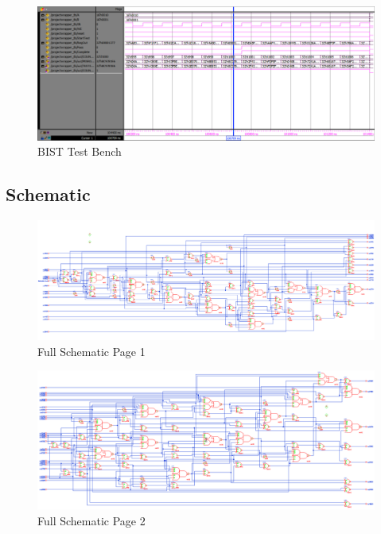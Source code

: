 \documentclass[11pt]{article}
\begin{document}
		\begin{figure}[H] 
			\centering 
			\includegraphics[width=\textwidth,height=\dimexpr\textheight-4\baselineskip-\abovecaptionskip-\belowcaptionskip\relax,keepaspectratio]{"Pictures/BIST-Test-Bench"}
			\caption{BIST Test Bench} 
			\label{fig:BIST-Test-Bench} 
		\end{figure}
	
	\subsection{Schematic}
	
	
		
		
		\begin{figure}[H] 
			\centering 
			\includegraphics[width=\textwidth,height=\dimexpr\textheight-4\baselineskip-\abovecaptionskip-\belowcaptionskip\relax,keepaspectratio]{"Pictures/Full Schematic Page 1"}
			\caption{Full Schematic Page 1} 
			\label{fig:Full-Schematic-Page-1} 
		\end{figure}
	
		\begin{figure}[H] 
			\centering 
			\includegraphics[width=\textwidth,height=\dimexpr\textheight-4\baselineskip-\abovecaptionskip-\belowcaptionskip\relax,keepaspectratio]{"Pictures/Full Schematic Page 2"}
			\caption{Full Schematic Page 2} 
			\label{fig:Full-Schematic-Page-2} 
		\end{figure}
	
\end{document}
